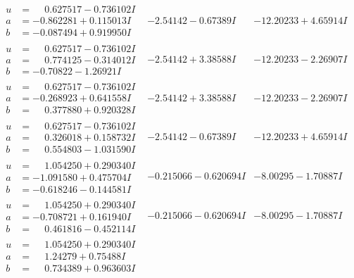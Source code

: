 \documentclass[1p]{elsarticle_modified}
\theoremstyle{definition}
\begin{document}
$$\begin{array}{c|c|c}
\begin{aligned}
u &= \phantom{-}0.627517 - 0.736102 I \\
a &= -0.862281 + 0.115013 I \\
b &= -0.087494 + 0.919950 I\end{aligned}
 & -2.54142 - 0.67389 I & -12.20233 + 4.65914 I \\ \hline\begin{aligned}
u &= \phantom{-}0.627517 - 0.736102 I \\
a &= \phantom{-}0.774125 - 0.314012 I \\
b &= -0.70822 - 1.26921 I\end{aligned}
 & -2.54142 + 3.38588 I & -12.20233 - 2.26907 I \\ \hline\begin{aligned}
u &= \phantom{-}0.627517 - 0.736102 I \\
a &= -0.268923 + 0.641558 I \\
b &= \phantom{-}0.377880 + 0.920328 I\end{aligned}
 & -2.54142 + 3.38588 I & -12.20233 - 2.26907 I \\ \hline\begin{aligned}
u &= \phantom{-}0.627517 - 0.736102 I \\
a &= \phantom{-}0.326018 + 0.158732 I \\
b &= \phantom{-}0.554803 - 1.031590 I\end{aligned}
 & -2.54142 - 0.67389 I & -12.20233 + 4.65914 I \\ \hline\begin{aligned}
u &= \phantom{-}1.054250 + 0.290340 I \\
a &= -1.091580 + 0.475704 I \\
b &= -0.618246 - 0.144581 I\end{aligned}
 & -0.215066 - 0.620694 I & -8.00295 - 1.70887 I \\ \hline\begin{aligned}
u &= \phantom{-}1.054250 + 0.290340 I \\
a &= -0.708721 + 0.161940 I \\
b &= \phantom{-}0.461816 - 0.452114 I\end{aligned}
 & -0.215066 - 0.620694 I & -8.00295 - 1.70887 I \\ \hline\begin{aligned}
u &= \phantom{-}1.054250 + 0.290340 I \\
a &= \phantom{-}1.24279 + 0.75488 I \\
b &= \phantom{-}0.734389 + 0.963603 I\end{aligned}

\end{array}$$
\end{document}
